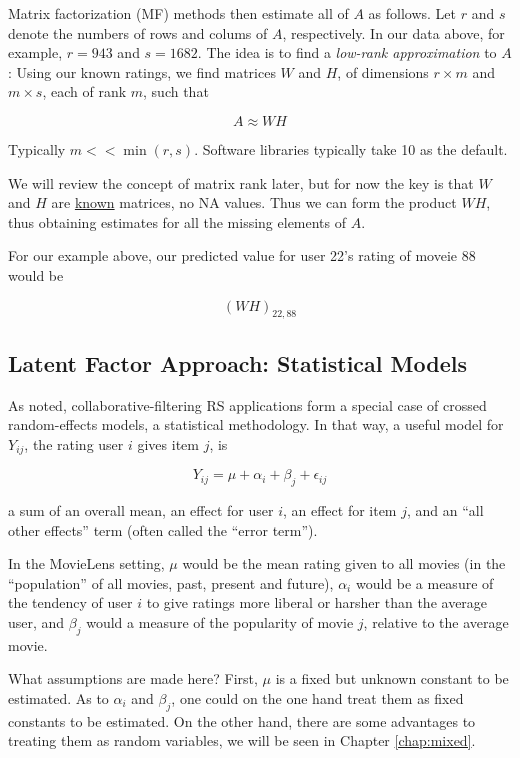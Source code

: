 Matrix factorization (MF) methods then estimate all of $A$ as follows.
Let $r$ and $s$ denote the numbers of rows and colums of $A$,
respectively.  In our data above, for example, $r = 943$ and $s = 1682$.
The idea is to find a \textit{low-rank approximation} to $A$:  Using our
known ratings, we find matrices $W$ and $H$, of dimensions $r \times m$
and $m \times s$, each of rank $m$, such that 

\begin{equation}
A \approx WH
\end{equation}

Typically $m << \min(r,s)$.  Software libraries typically take 10 as the
default.

We will review the concept of matrix rank later, but for now the key is
that $W$ and $H$ are \underline{known} matrices, no NA values.  Thus we
can form the product $WH$, thus obtaining estimates for all the missing
elements of $A$.

For our example above, our predicted value for user 22's rating of
moveie 88 would be

\begin{equation}
(WH)_{22,88}
\end{equation}

\subsection{Latent Factor Approach: Statistical Models}

As noted, collaborative-filtering RS applications form a special case of
crossed random-effects models, a statistical methodology.  In that way,
a useful model for $Y_{ij}$, the rating user $i$ gives item $j$, is

\begin{equation}
Y_{ij} = \mu + \alpha_i + \beta_j + \epsilon_{ij}
\end{equation}

a sum of an overall mean, an effect for user $i$, an effect for item
$j$, and an ``all other effects'' term (often called the ``error
term'').

In the MovieLens setting, $\mu$ would be the mean rating given to all
movies (in the ``population'' of all movies, past, present and future),
$\alpha_i$ would be a measure of the tendency of user $i$ to give
ratings more liberal or harsher than the average user, and $\beta_j$
would a measure of the popularity of movie $j$, relative to the average
movie.

What assumptions are made here?  First, $\mu$ is a fixed but unknown
constant to be estimated.  As to $\alpha_i$ and $\beta_j$, one could on
the one hand treat them as fixed constants to be estimated.  On the
other hand, there are some advantages to treating them as random
variables, we will be seen in Chapter \ref{chap:mixed}.


